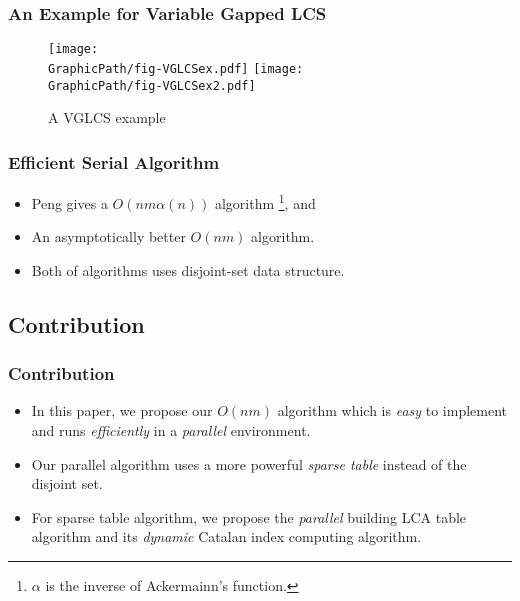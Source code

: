 \begin{frame}
    \frametitle{An Example for Variable Gapped LCS}
    \begin{figure}[!thb]
      \centering
      \texttt{[image: \\GraphicPath/fig-VGLCSex.pdf]}
      \texttt{[image: \\GraphicPath/fig-VGLCSex2.pdf]}
      \caption{A VGLCS example} \label{fig:VGLCSex}
    \end{figure}
\end{frame}

\begin{frame}
    \frametitle{Efficient Serial Algorithm}
    \begin{itemize}
        \setlength\itemsep{1em}
        \item 
            Peng gives a $O(n m \alpha(n))$ algorithm \footnote{$\alpha$
            is the inverse of Ackermainn's function.}, and
        \item
            An asymptotically better $O(n m)$ algorithm.
        \item 
            Both of algorithms uses disjoint-set data structure.
    \end{itemize}
\end{frame}

\subsection{Contribution}
\begin{frame}
    \frametitle{Contribution}
    \begin{itemize}
        \setlength\itemsep{1em}
        \item
            In this paper, we propose our $O(nm)$ algorithm which is {\em
            easy} to implement and runs {\em efficiently} in a {\em
            parallel} environment.
        \item
            Our parallel algorithm uses a more powerful {\em sparse table}
            instead of the disjoint set.
        \item
            For sparse table algorithm, we propose the {\em parallel}
            building LCA table algorithm and its {\em dynamic} Catalan
            index computing algorithm.
    \end{itemize}
\end{frame}
